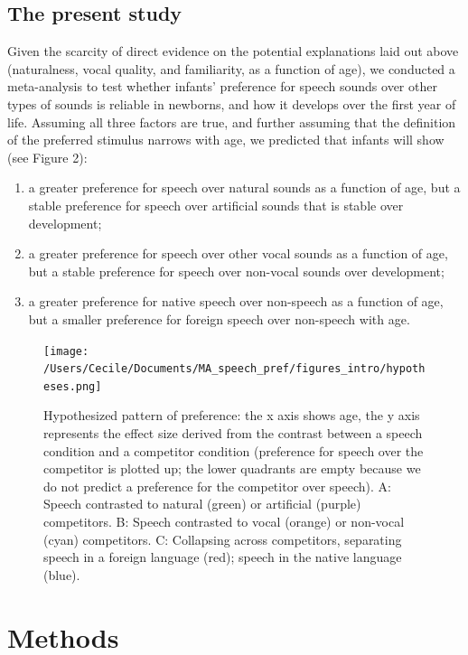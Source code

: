 \documentclass[man]{apa6}
\providecommand{\tightlist}{%
  \setlength{\itemsep}{0pt}\setlength{\parskip}{0pt}}
\begin{document}
\subsection{The present study}\label{the-present-study}

Given the scarcity of direct evidence on the potential explanations laid
out above (naturalness, vocal quality, and familiarity, as a function of
age), we conducted a meta-analysis to test whether infants' preference
for speech sounds over other types of sounds is reliable in newborns,
and how it develops over the first year of life. Assuming all three
factors are true, and further assuming that the definition of the
preferred stimulus narrows with age, we predicted that infants will show
(see Figure 2):

\begin{enumerate}
\def\labelenumi{\arabic{enumi}.}
\tightlist
\item
  a greater preference for speech over natural sounds as a function of
  age, but a stable preference for speech over artificial sounds that is
  stable over development;
\item
  a greater preference for speech over other vocal sounds as a function
  of age, but a stable preference for speech over non-vocal sounds over
  development;
\item
  a greater preference for native speech over non-speech as a function
  of age, but a smaller preference for foreign speech over non-speech
  with age.
\end{enumerate}

\begin{figure}
\centering
\texttt{[image: /Users/Cecile/Documents/MA\_speech\_pref/figures\_intro/hypotheses.png]}
\caption{\label{fig:unnamed-chunk-2}Hypothesized pattern of preference: the
x axis shows age, the y axis represents the effect size derived from the
contrast between a speech condition and a competitor condition
(preference for speech over the competitor is plotted up; the lower
quadrants are empty because we do not predict a preference for the
competitor over speech). A: Speech contrasted to natural (green) or
artificial (purple) competitors. B: Speech contrasted to vocal (orange)
or non-vocal (cyan) competitors. C: Collapsing across competitors,
separating speech in a foreign language (red); speech in the native
language (blue).}
\end{figure}

\section{Methods}\label{methods}
\end{document}
